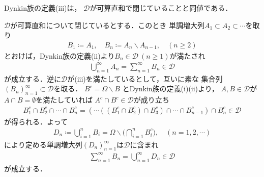 \newpage
\begin{screen}
	\begin{thm}
		Dynkin族の定義(iii)は，
		$\mathscr{D}$が可算直和で閉じていることと同値である．
	\end{thm}
\end{screen}

\begin{prf}
	$\mathscr{D}$が可算直和について閉じているとする．このとき
	単調増大列$A_1 \subset A_2 \subset \cdots$を取り
	\begin{align}
		B_1 \coloneqq A_1,
		\quad B_n \coloneqq A_n \backslash A_{n-1},
		\quad (n \geq 2)
	\end{align}
	とおけば，Dynkin族の定義(ii)より$B_n \in \mathscr{D}\ (n \geq 1)$が満たされ
	\begin{align}
		\bigcup_{n=1}^{\infty} A_n = \sum_{n=1}^{\infty} B_n \in \mathscr{D} 
	\end{align}
	が成立する．逆に$\mathscr{D}$が(iii)を満たしているとして，互いに素な
	集合列$(B_n)_{n=1}^{\infty} \subset \mathscr{D}$を取る．
	$B^c = \Omega \backslash B$
	とDynkin族の定義(i)(ii)より，
	$A,B \in \mathscr{D}$が$A \cap B = \emptyset$を満たしていれば
	$A^c \cap B^c \in \mathscr{D}$が成り立ち
	\begin{align}
		B_1^c \cap B_2^c \cap \cdots \cap B_n^c
		= \left( \cdots \left( \left( B_1^c \cap B_2^c \right) \cap B_3^c \right) \cap \cdots \cap B_{n-1}^c \right) \cap B_n^c
		\in \mathscr{D}
	\end{align}
	が得られる．よって
	\begin{align}
		D_n \coloneqq \bigcup_{i=1}^n B_i = \Omega \backslash \Biggl( \bigcap_{i=1}^n B_i^c \Biggr),
		\quad (n=1,2,\cdots)
	\end{align}
	により定める単調増大列$(D_n)_{n=1}^{\infty}$は$\mathscr{D}$に含まれ
	\begin{align}
		\sum_{n=1}^{\infty} B_n = \bigcup_{n=1}^{\infty} D_n \in \mathscr{D}
	\end{align}
	が成立する．
	\QED
\end{prf}

